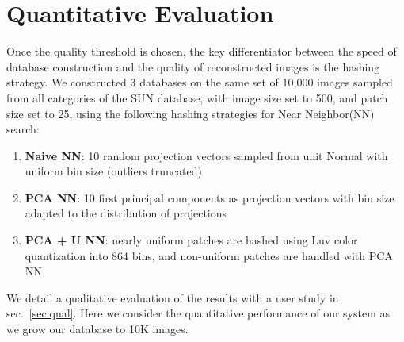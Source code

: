 \section{Quantitative Evaluation}\label{sec:performance}

Once the quality threshold is chosen, the key differentiator
between the speed of database construction and the quality of
reconstructed images is the hashing strategy.
We constructed 3 databases on the same set of
10,000 images sampled
from all categories of the SUN database, with image size
set to 500, and patch size set to 25, using the following
hashing strategies for Near Neighbor(NN) search:
\begin{enumerate}
\item \textbf{Naive NN}: 10 random projection vectors sampled from unit Normal with
uniform bin size (outliers truncated)
\item \textbf{PCA NN}: 10 first principal components as projection vectors with
bin size adapted to the distribution of projections
\item \textbf{PCA + U NN}: nearly uniform patches are hashed using Luv color
quantization into 864 bins, and non-uniform patches are handled with PCA NN
\end{enumerate}
We detail a qualitative evaluation of the results with a user study in sec.~\ref{sec:qual}.
Here we consider the quantitative performance of our system as we grow our database to 10K images.

